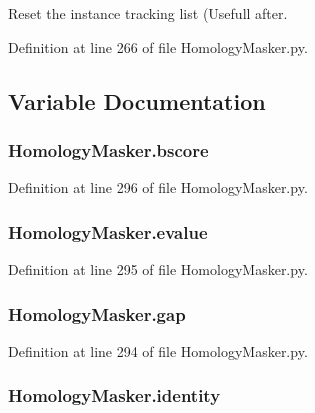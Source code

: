 Reset the instance tracking list (Usefull after. 



Definition at line 266 of file Homology\-Masker.\-py.



\subsection{Variable Documentation}
\hypertarget{namespaceHomologyMasker_a615220b802ad22a46f3daea7491caac5}{
\subsubsection[{bscore}]{\setlength{\rightskip}{0pt plus 5cm}Homology\-Masker.\-bscore}}\label{namespaceHomologyMasker_a615220b802ad22a46f3daea7491caac5}


Definition at line 296 of file Homology\-Masker.\-py.

\hypertarget{namespaceHomologyMasker_a7e1745cc4eda6e4fb742b5bf4da0efd3}{
\subsubsection[{evalue}]{\setlength{\rightskip}{0pt plus 5cm}Homology\-Masker.\-evalue}}\label{namespaceHomologyMasker_a7e1745cc4eda6e4fb742b5bf4da0efd3}


Definition at line 295 of file Homology\-Masker.\-py.

\hypertarget{namespaceHomologyMasker_afba3ae42634f80c7df2f46198386a57a}{
\subsubsection[{gap}]{\setlength{\rightskip}{0pt plus 5cm}Homology\-Masker.\-gap}}\label{namespaceHomologyMasker_afba3ae42634f80c7df2f46198386a57a}


Definition at line 294 of file Homology\-Masker.\-py.

\hypertarget{namespaceHomologyMasker_a29c000fdc43af648c175041341b20b7d}{
\subsubsection[{identity}]{\setlength{\rightskip}{0pt plus 5cm}Homology\-Masker.\-identity}}\label{namespaceHomologyMasker_a29c000fdc43af648c175041341b20b7d}


